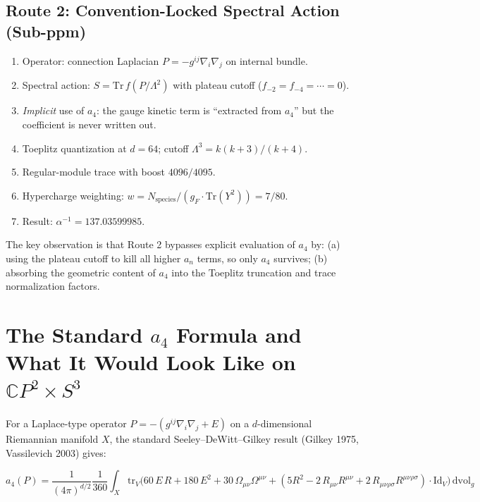 \documentclass[11pt,a4paper]{article}
\begin{document}
\subsection{Route 2: Convention-Locked Spectral Action (Sub-ppm)}

\begin{enumerate}
\item Operator: connection Laplacian $P = -g^{ij}\nabla_i\nabla_j$ on internal bundle.
\item Spectral action: $S = \mathrm{Tr}\,f(P/\Lambda^2)$ with plateau cutoff
($f_{-2} = f_{-4} = \cdots = 0$).
\item \emph{Implicit} use of $a_4$: the gauge kinetic term is ``extracted from $a_4$''
but the coefficient is never written out.
\item Toeplitz quantization at $d = 64$; cutoff $\Lambda^3 = k(k+3)/(k+4)$.
\item Regular-module trace with boost $4096/4095$.
\item Hypercharge weighting: $w = N_{\mathrm{species}}/(g_F \cdot \mathrm{Tr}(Y^2)) = 7/80$.
\item Result: $\alpha^{-1} = 137.03599985$.
\end{enumerate}

The key observation is that Route 2 bypasses explicit evaluation of $a_4$ by:
(a) using the plateau cutoff to kill all higher $a_n$ terms, so only $a_4$
survives; (b) absorbing the geometric content of $a_4$ into the Toeplitz
truncation and trace normalization factors.

\section{The Standard $a_4$ Formula and What It Would Look Like on $\mathbb{C}P^2 \times S^3$}

For a Laplace-type operator $P = -(g^{ij}\nabla_i\nabla_j + E)$ on a
$d$-dimensional Riemannian manifold $X$, the standard Seeley--DeWitt--Gilkey
result (Gilkey 1975, Vassilevich 2003) gives:

\begin{equation}
a_4(P) = \frac{1}{(4\pi)^{d/2}} \frac{1}{360} \int_X \mathrm{tr}_V \!\Big(
60\,E\,R + 180\,E^2 + 30\,\Omega_{\mu\nu}\Omega^{\mu\nu}
+ (5R^2 - 2\,R_{\mu\nu}R^{\mu\nu} + 2\,R_{\mu\nu\rho\sigma}R^{\mu\nu\rho\sigma})
\cdot \mathrm{Id}_V
\Big)\,\mathrm{dvol}_g
\end{equation}
\end{document}
